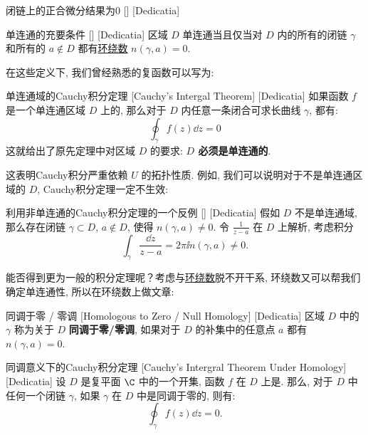 \documentclass[UTF8]{ctexart}
\begin{document}
        \begin{ppt}
            [UUID]
            {闭链上的正合微分结果为0}
            []
            [Dedicatia]
        \end{ppt}

        \begin{thm}
            [UUID]
            {单连通的充要条件}
            []
            [Dedicatia]
            区域 \(D\) 单连通当且仅当对 \(D\) 内的所有的闭链 \(\gamma\) 和所有的 \(a\notin D\) 都有\hyperref[dfn:WindingNumber]{环绕数} \(n(\gamma,a)=0\).
        \end{thm}

        在这些定义下, 我们曾经熟悉的复函数可以写为: 

        \begin{thm}
            [UUID]
            {单连通域的Cauchy积分定理}
            [Cauchy's Intergal Theorem]
            [Dedicatia]
            如果函数 \(f\) 是一个单连通区域 \(D\) 上的, 那么对于 \(D\) 内任意一条闭合可求长曲线 \(\gamma\), 都有: 
            \[\oint_{\gamma} f(z) \dd z = 0\]
            这就给出了原先定理中对区域 \(D\) 的要求: \textbf{ \(D\) 必须是单连通的}. 
        \end{thm}

        这表明Cauchy积分严重依赖 \(U\) 的拓扑性质. 例如, 我们可以说明对于不是单连通区域的 \(D\), Cauchy积分定理一定不生效: 

        \begin{cxmp}
            [UUID]
            {利用非单连通的Cauchy积分定理的一个反例}
            []
            [Dedicatia]
            假如 \(D\) 不是单连通域, 那么存在闭链 \(\gamma\subset D\),  \(a\notin D\), 使得 \(n(\gamma,a)\neq 0\). 令 \(\frac{1}{z-a}\) 在 \(D\) 上解析, 考虑积分
            \[\int_\gamma\frac{\dd{z}}{z-a}=2\pi\ii n(\gamma,a)\neq 0.\]
        \end{cxmp}

        能否得到更为一般的积分定理呢？考虑\CauchyThm 与\hyperref[dfn:WindingNumber]{环绕数}脱不开干系, 环绕数又可以帮我们确定单连通性, 所以在环绕数上做文章: 

        \begin{dfn}
            [NullHomologous]
            {同调于零 / 零调}
            [Homologous to Zero / Null Homology]
            [Dedicatia]
            区域 \(D\) 中的 \(\gamma\) 称为关于 \(D\) \textbf{同调于零/零调}, 如果对于 \(D\) 的补集中的任意点 \(a\) 都有 \(n(\gamma,a)=0\).
        \end{dfn}
        
        \begin{thm}
            [UUID]
            {同调意义下的Cauchy积分定理}
            [Cauchy's Intergral Theorem Under Homology]
            [Dedicatia]
            设 \(D\) 是复平面 \(\C\) 中的一个开集, 函数 \(f\) 在 \(D\) 上是. 那么, 对于 \(D\) 中任何一个闭链 \(\gamma\), 如果 \(\gamma\) 在 \(D\) 中是同调于零的, 则有: 
            \[\oint_{\gamma} f(z) \dd z = 0.\]
        \end{thm}
\end{document}

